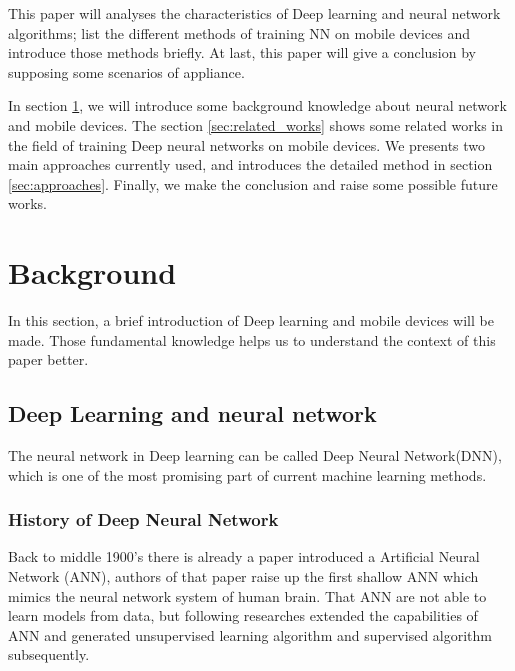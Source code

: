 \documentclass[article]{aaltoseries}
\begin{document}
This paper will analyses the characteristics of Deep learning and neural network algorithms;
list the different methods of training NN on mobile devices and introduce those methods briefly. 
At last, this paper will give a conclusion by supposing some scenarios of appliance.


In section \ref{sec:background}, we will introduce some background knowledge about neural network and mobile devices.
The section \ref{sec:related_works} shows some related works in the field of training Deep neural networks on mobile devices.
We presents two main approaches currently used, and introduces the detailed method in section \ref{sec:approaches}.
Finally, we make the conclusion and raise some possible future works.







\section{Background}
\label{sec:background}

In this section, a brief introduction of Deep learning and mobile devices will be made. Those fundamental 
knowledge helps us to understand the context of this paper better.




\subsection{Deep Learning and neural network}

The neural network in Deep learning can be called Deep Neural Network(DNN), which is one of the most promising 
part of current machine learning methods. 

\subsubsection{History of Deep Neural Network}

Back to middle 1900's there is already a paper introduced a Artificial Neural Network (ANN)\cite{Warren1943}, authors
of that paper raise up the first shallow ANN which mimics the neural network system of human brain. That ANN are not
able to learn models from data, but following researches extended the capabilities of ANN and generated unsupervised 
learning algorithm and supervised algorithm subsequently.
\end{document}
